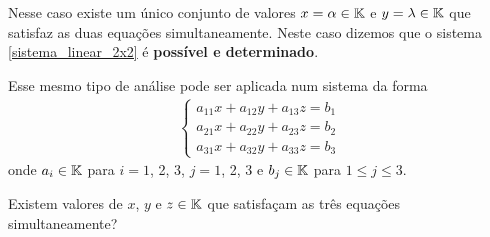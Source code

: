 \documentclass{beamer}
\begin{document}
    \begin{frame}
        \begin{center}
        \end{center}

        Nesse caso existe um único conjunto de valores $x = \alpha \in \mathbb{K}$ e $y = \lambda \in \mathbb{K}$ \pause que satisfaz as duas equações simultaneamente. \pause Neste caso dizemos que o sistema \eqref{sistema_linear_2x2} \pause é \textbf{possível e determinado}.\pause
    \end{frame}

    \begin{frame}
        Esse mesmo tipo de análise pode ser aplicada num sistema da forma
        \begin{align}
            \begin{cases}\label{sistema_linear_3x3}
                a_{11}x + a_{12}y + a_{13}z = b_1\\
                a_{21}x + a_{22}y + a_{23}z = b_2\\
                a_{31}x + a_{32}y + a_{33}z = b_3
            \end{cases}
        \end{align}
        onde $a_i \in \mathbb{K}$ para $i = 1$, 2, 3, $j = 1$, 2, 3 e $b_j \in \mathbb{K}$ para $1 \le j \le 3$.\pause

        \vspace{.3cm}

        Existem valores de $x$, $y$ e $z \in \mathbb{K}$ que satisfaçam as três equações simultaneamente?
    \end{frame}
\end{document}
